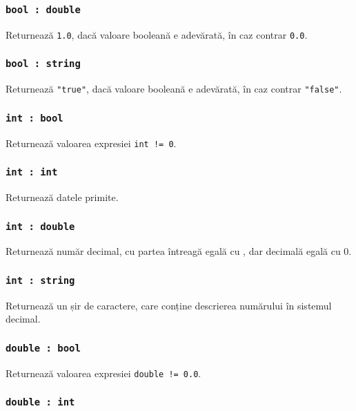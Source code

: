 \subsubsection{\lstinline|bool : double|}

Returnează \lstinline|1.0|, dacă valoare booleană e adevărată, în caz contrar \lstinline|0.0|.

\subsubsection{\lstinline|bool : string|}

Returnează \lstinline|"true"|, dacă valoare booleană e adevărată, în caz contrar \lstinline|"false"|.

\subsubsection{\lstinline|int : bool|}

Returnează valoarea expresiei \lstinline|int != 0|.

\subsubsection{\lstinline|int : int|}

Returnează datele primite.

\subsubsection{\lstinline|int : double|}

Returnează număr decimal, cu partea întreagă egală cu  \integer, dar decimală egală cu 0.

\subsubsection{\lstinline|int : string|}

Returnează un șir de caractere, care conține descrierea numărului \integer{} în sistemul decimal.

\subsubsection{\lstinline|double : bool|}

Returnează valoarea expresiei \lstinline|double != 0.0|.

\subsubsection{\lstinline|double : int|}

